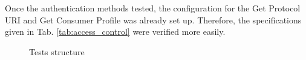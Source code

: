 Once the authentication methods tested, the configuration for the Get Protocol URI and Get Consumer Profile was already set up. Therefore, the specifications given in Tab. \ref{tab:access_control} were verified more easily.

\begin{figure}[!tbh]
	\centering
	\qquad
	\caption{Tests structure}
	\label{fig:tests}
\end{figure}



